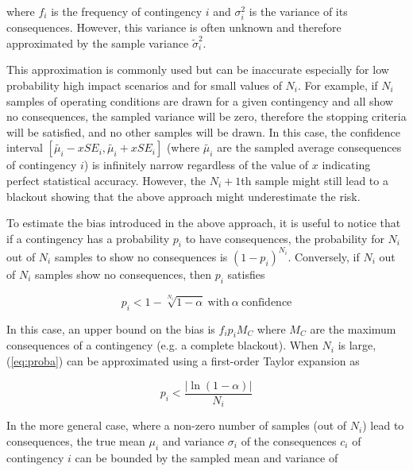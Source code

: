 \noindent where \(f_i\) is the frequency of contingency \(i\) and \(\sigma_i^2\) is the variance of its consequences. However, this variance is often unknown and therefore approximated by the sample variance \(\tilde{\sigma}_i^2\).

This approximation is commonly used but can be inaccurate especially for low probability high impact scenarios and for small values of \(N_i\). For example, if \(N_i\) samples of operating conditions are drawn for a given contingency and all show no consequences, the sampled variance will be zero, therefore the stopping criteria will be satisfied, and no other samples will be drawn. In this case, the confidence interval \([\tilde{\mu_i} - x SE_i, \tilde{\mu_i} + x SE_i]\) (where \(\tilde{\mu_i}\) are the sampled average consequences of contingency \(i\)) is infinitely narrow regardless of the value of \(x\) indicating perfect statistical accuracy. However, the \(N_i+1\)th sample might still lead to a blackout showing that the above approach might underestimate the risk.

To estimate the bias introduced in the above approach, it is useful to notice that if a contingency has a probability \(p_i\) to have consequences, the probability for \(N_i\) out of \(N_i\) samples to show no consequences is \((1-p_i)^{N_i}\). Conversely, if \(N_i\) out of \(N_i\) samples show no consequences, then \(p_i\) satisfies

\begin{equation} \label{eq:proba}
  p_i < 1 - \sqrt[N_i]{1-\alpha} \ \text{with}\ \alpha \ \text{confidence}
\end{equation}

In this case, an upper bound on the bias is \(f_i p_i M_C\) where \(M_C\) are the maximum consequences of a contingency (e.g. a complete blackout). When \(N_i\) is large, (\ref{eq:proba}) can be approximated using a first-order Taylor expansion as

\begin{equation} \label{eq:proba_approx}
  p_i < \frac{|\ln(1-\alpha)|}{N_i}
\end{equation}


In the more general case, where a non-zero number of samples (out of \(N_i\)) lead to consequences, the true mean \(\mu_i\) and variance \(\sigma_i\) of the consequences \(c_i\) of contingency \(i\) can be bounded by the sampled mean and variance of

